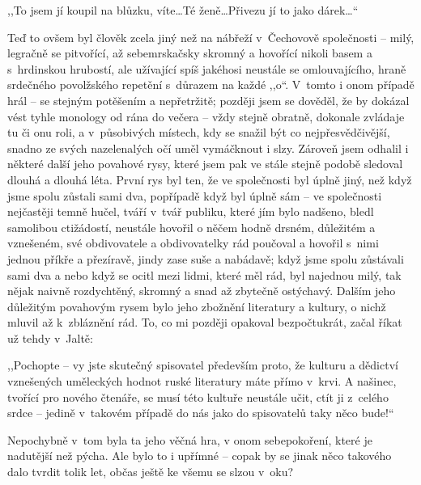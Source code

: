 ,,To jsem jí koupil na blůzku, víte\ldots Té ženě\ldots Přivezu jí to jako dárek\ldots``

Teď to ovšem byl člověk zcela jiný než na nábřeží v Čechovově společnosti -- milý, legračně se pitvořící, až sebemrskačsky skromný a hovořící nikoli basem a s hrdinskou hrubostí, ale užívající spíš jakéhosi neustále se omlouvajícího, hraně srdečného povolžského repetění s důrazem na každé ,,o``. V tomto i onom případě hrál -- se stejným potěšením a nepřetržitě; později jsem se dověděl, že by dokázal vést tyhle monology od rána do večera -- vždy stejně obratně, dokonale zvládaje tu či onu roli, a v působivých místech, kdy se snažil být co nejpřesvědčivější, snadno ze svých nazelenalých očí uměl vymáčknout i slzy. Zároveň jsem odhalil i některé další jeho povahové rysy, které jsem pak ve stále stejně podobě sledoval dlouhá a dlouhá léta. První rys byl ten, že ve společnosti byl úplně jiný, než když jsme spolu zůstali sami dva, popřípadě když byl úplně sám -- ve společnosti nejčastěji temně hučel, tváří v tvář publiku, které jím bylo nadšeno, bledl samolibou ctižádostí, neustále hovořil o něčem hodně drsném, důležitém a vznešeném, své obdivovatele a obdivovatelky rád poučoval a hovořil s nimi jednou příkře a přezíravě, jindy zase suše a nabádavě; když jsme spolu zůstávali sami dva a nebo když se ocitl mezi lidmi, které měl rád, byl najednou milý, tak nějak naivně rozdychtěný, skromný a snad až zbytečně ostýchavý. Dalším jeho důležitým povahovým rysem bylo jeho zbožnění literatury a kultury, o nichž mluvil až k zbláznění rád. To, co mi později opakoval bezpočtukrát, začal říkat už tehdy v Jaltě:

,,Pochopte -- vy jste skutečný spisovatel především proto, že kulturu a dědictví vznešených uměleckých hodnot ruské literatury máte přímo v krvi. A našinec, tvořící pro nového čtenáře, se musí této kultuře neustále učit, ctít ji z celého srdce -- jedině v takovém případě do nás jako do spisovatelů taky něco bude!``

Nepochybně v tom byla ta jeho věčná hra, v onom sebepokoření, které je nadutější než pýcha. Ale bylo to i upřímné -- copak by se jinak něco takového dalo tvrdit tolik let, občas ještě ke všemu se slzou v oku?

